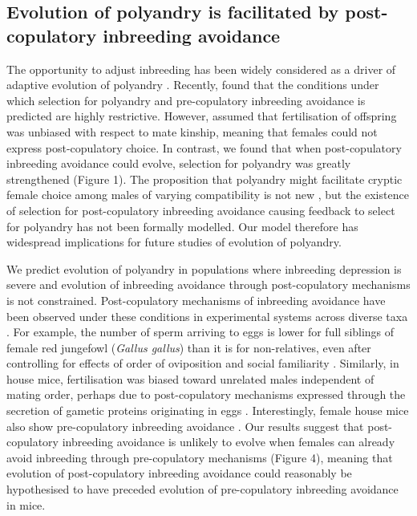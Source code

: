 \documentclass[10pt,letterpaper]{article}
\begin{document}
\subsection*{Evolution of polyandry is facilitated by post-copulatory inbreeding avoidance}

The opportunity to adjust inbreeding has been widely considered as a driver of adaptive evolution of polyandry \cite[][]{Tregenza2002, Foerster2003, Akcay2007, Varian-Ramos2012, Kingma2013, Lehtonen2015, Reid2014}. Recently, \cite{Duthie} found that the conditions under which selection for polyandry and pre-copulatory inbreeding avoidance is predicted are highly restrictive. However, \cite{Duthie} assumed that fertilisation of offspring was unbiased with respect to mate kinship, meaning that females could not express post-copulatory choice. In contrast, we found that when post-copulatory inbreeding avoidance could evolve, selection for polyandry was greatly strengthened (Figure 1). The proposition that polyandry might facilitate cryptic female choice among males of varying compatibility is not new \cite[e.g.,][]{Zeh1997}, but the existence of selection for post-copulatory inbreeding avoidance causing feedback to select for polyandry has not been formally modelled. Our model therefore has widespread implications for future studies of evolution of polyandry. 

We predict evolution of polyandry in populations where inbreeding depression is severe and evolution of inbreeding avoidance through post-copulatory mechanisms is not constrained. Post-copulatory mechanisms of inbreeding avoidance have been observed under these conditions in experimental systems across diverse taxa \cite[e.g.,][]{Pizzari2004, Firman2008, Bretman2009, Gasparini2011, Tuni2013, Firman2015}. For example, the number of sperm arriving to eggs is lower for full siblings of female red jungefowl (\textit{Gallus gallus}) than it is for non-relatives, even after controlling for effects of order of oviposition and social familiarity \cite[][]{Pizzari2004}. Similarly, in house mice, fertilisation was biased toward unrelated males independent of mating order, perhaps due to post-copulatory mechanisms expressed through the secretion of gametic proteins originating in eggs \cite[][]{Firman2008, Firman2015}. Interestingly, female house mice also show pre-copulatory inbreeding avoidance  \cite[][]{Potts1991, Roberts2003}. Our results suggest that post-copulatory inbreeding avoidance is unlikely to evolve when females can already avoid inbreeding through pre-copulatory mechanisms (Figure 4), meaning that evolution of post-copulatory inbreeding avoidance could reasonably be hypothesised to have preceded evolution of pre-copulatory inbreeding avoidance in mice. 
\end{document}
